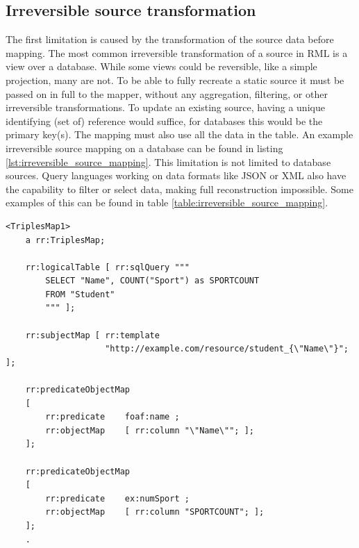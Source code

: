 \subsection{Irreversible source transformation}
\label{subsection:irreversible_source_transformation}
The first limitation is caused by the transformation of the source data before mapping. The most common irreversible transformation of a source in RML is a view over a database. While some views could be reversible, like a simple projection, many are not. To be able to fully recreate a static source it must be passed on in full to the mapper, without any aggregation, filtering, or other irreversible transformations. To update an existing source, having a unique identifying (set of) reference would suffice, for databases this would be the primary key(s). The mapping must also use all the data in the table. An example irreversible source mapping on a database can be found in listing \ref{lst:irreversible_source_mapping}. This limitation is not limited to database sources. Query languages working on data formats like JSON or XML also have the capability to filter or select data, making full reconstruction impossible. Some examples of this can be found in table \ref{table:irreversible_source_mapping}.

\begin{lstlisting}[caption={Irreversible source mapping from R2RML Test cases}, label={lst:irreversible_source_mapping}, captionpos=b, basicstyle=\small, float=!ht, frame=single]
<TriplesMap1>
    a rr:TriplesMap;
        
    rr:logicalTable [ rr:sqlQuery """
        SELECT "Name", COUNT("Sport") as SPORTCOUNT
        FROM "Student"
        """ ];

    rr:subjectMap [ rr:template 
                    "http://example.com/resource/student_{\"Name\"}"; ]; 

    rr:predicateObjectMap
    [ 
        rr:predicate	foaf:name ; 
        rr:objectMap	[ rr:column "\"Name\""; ];
    ];

    rr:predicateObjectMap
    [ 
		rr:predicate	ex:numSport ; 
		rr:objectMap	[ rr:column "SPORTCOUNT"; ];
    ];
    .
\end{lstlisting}

